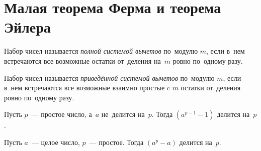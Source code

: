 
\section*{Малая теорема Ферма и теорема Эйлера}


\begingroup \def\eulerphi{\mathrm{\phi}}

Набор чисел называется \emph{полной системой вычетов} по~модулю $m$, если в~нем
встречаются все возможные остатки от~деления на~$m$ ровно по~одному разу.

Набор чисел называется \emph{приведённой системой вычетов} по~модулю $m$, если
в~нем встречаются все возможные взаимно простые c $m$ остатки от~деления ровно
по~одному разу.

\mbox{}%
Пусть $p$~--- простое число, а~$a$ не~делится на~$p$.
Тогда $(a^{p-1} - 1)$ делится на~$p$.

\mbox{}%
Пусть $a$~--- целое число, $p$~--- простое.
Тогда $(a^p - a)$ делится на~$p$.

